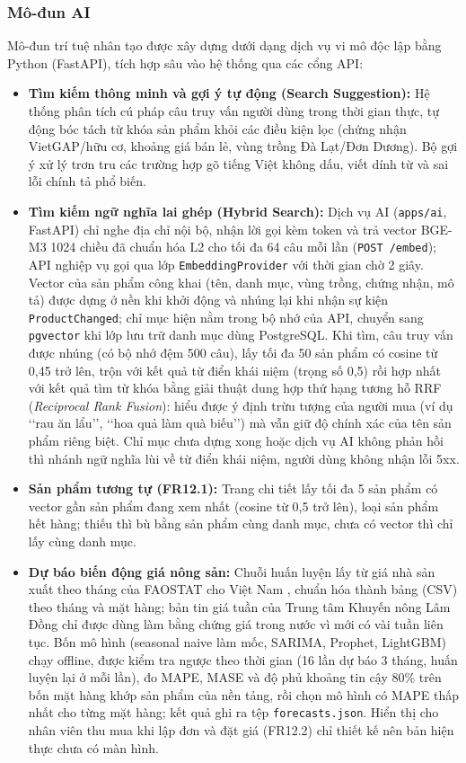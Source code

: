 \subsubsection*{Mô-đun AI}
\label{sec:hienthucAI}
Mô-đun trí tuệ nhân tạo được xây dựng dưới dạng dịch vụ vi mô độc lập bằng Python (FastAPI), tích hợp sâu vào hệ thống qua các cổng API:
\begin{itemize}
    \item \textbf{Tìm kiếm thông minh và gợi ý tự động (Search Suggestion):} Hệ thống phân tích cú pháp câu truy vấn người dùng trong thời gian thực, tự động bóc tách từ khóa sản phẩm khỏi các điều kiện lọc (chứng nhận VietGAP/hữu cơ, khoảng giá bán lẻ, vùng trồng Đà Lạt/Đơn Dương). Bộ gợi ý xử lý trơn tru các trường hợp gõ tiếng Việt không dấu, viết dính từ và sai lỗi chính tả phổ biến.
    \item \textbf{Tìm kiếm ngữ nghĩa lai ghép (Hybrid Search):} Dịch vụ AI (\texttt{apps/ai}, FastAPI) chỉ nghe địa chỉ nội bộ, nhận lời gọi kèm token và trả vector BGE-M3 1024 chiều đã chuẩn hóa L2 cho tối đa 64 câu mỗi lần (\texttt{POST /embed}); API nghiệp vụ gọi qua lớp \texttt{EmbeddingProvider} với thời gian chờ 2 giây. Vector của sản phẩm công khai (tên, danh mục, vùng trồng, chứng nhận, mô tả) được dựng ở nền khi khởi động và nhúng lại khi nhận sự kiện \texttt{ProductChanged}; chỉ mục hiện nằm trong bộ nhớ của API, chuyển sang \texttt{pgvector} khi lớp lưu trữ danh mục dùng PostgreSQL. Khi tìm, câu truy vấn được nhúng (có bộ nhớ đệm 500 câu), lấy tối đa 50 sản phẩm có cosine từ 0,45 trở lên, trộn với kết quả từ điển khái niệm (trọng số 0,5) rồi hợp nhất với kết quả tìm từ khóa bằng giải thuật dung hợp thứ hạng tương hỗ RRF (\emph{Reciprocal Rank Fusion}): hiểu được ý định trừu tượng của người mua (ví dụ \lq\lq rau ăn lẩu\rq\rq, \lq\lq hoa quả làm quà biếu\rq\rq) mà vẫn giữ độ chính xác của tên sản phẩm riêng biệt. Chỉ mục chưa dựng xong hoặc dịch vụ AI không phản hồi thì nhánh ngữ nghĩa lùi về từ điển khái niệm, người dùng không nhận lỗi 5xx.
    \item \textbf{Sản phẩm tương tự (FR12.1):} Trang chi tiết lấy tối đa 5 sản phẩm có vector gần sản phẩm đang xem nhất (cosine từ 0,5 trở lên), loại sản phẩm hết hàng; thiếu thì bù bằng sản phẩm cùng danh mục, chưa có vector thì chỉ lấy cùng danh mục.
    \item \textbf{Dự báo biến động giá nông sản:} Chuỗi huấn luyện lấy từ giá nhà sản xuất theo tháng của FAOSTAT cho Việt Nam \parencite{faostat_producerprices}, chuẩn hóa thành bảng (CSV) theo tháng và mặt hàng; bản tin giá tuần của Trung tâm Khuyến nông Lâm Đồng \parencite{khuyennong_lamdong_gia} chỉ được dùng làm bằng chứng giá trong nước vì mới có vài tuần liên tục. Bốn mô hình (seasonal naive làm mốc, SARIMA, Prophet, LightGBM) chạy offline, được kiểm tra ngược theo thời gian (16 lần dự báo 3 tháng, huấn luyện lại ở mỗi lần), đo MAPE, MASE và độ phủ khoảng tin cậy 80\% trên bốn mặt hàng khớp sản phẩm của nền tảng, rồi chọn mô hình có MAPE thấp nhất cho từng mặt hàng; kết quả ghi ra tệp \texttt{forecasts.json}. Hiển thị cho nhân viên thu mua khi lập đơn và đặt giá (FR12.2) chỉ thiết kế nên bản hiện thực chưa có màn hình.
\end{itemize}

